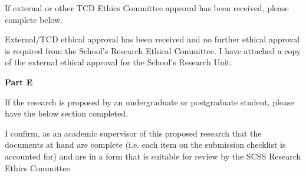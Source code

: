 If external or other TCD Ethics Committee approval has been received, please complete below.

\vspace{0.5cm}
\begin{tcolorbox}[colback=white]
    External/TCD ethical approval has been received and no further ethical approval is required from the School's Research Ethical Committee. I have attached a copy of the external ethical approval for the School's Research Unit.
    
\end{tcolorbox}

\vspace{0.5cm}
\begin{tcolorbox}
    \centering
    \textbf{Part E}
\end{tcolorbox}

If the research is proposed by an undergraduate or postgraduate student, please have the below section completed.

\begin{tcolorbox}[colback=white]
    I confirm, as an academic supervisor of this proposed research that the documents at hand are complete (i.e. each item on the submission checklist is accounted for) and are in a form that is suitable for review by the SCSS Research Ethics Committee
    
\end{tcolorbox}

